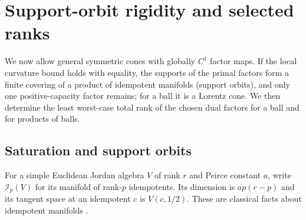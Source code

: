 \section{Support-orbit rigidity and selected ranks}\label{sec:orbits}

We now allow general symmetric cones with globally $C^1$ factor maps.
If the local curvature bound holds with equality, the supports of the
primal factors form a finite covering of a product of idempotent
manifolds (support orbits), and only one positive-capacity factor
remains; for a ball it is a Lorentz cone. We then determine the least
worst-case total rank of the chosen dual factors for a ball and for
products of balls.

\subsection{Saturation and support orbits}
For a simple Euclidean Jordan algebra $V$ of rank $r$ and Peirce
constant $a$, write $\mathcal I_p(V)$ for its manifold of rank-$p$
idempotents. Its dimension is $ap(r-p)$ and its tangent space at an idempotent $c$
is $V(c,1/2)$. These are classical facts about idempotent manifolds
\cite{FK1994,Nomura1994}.

